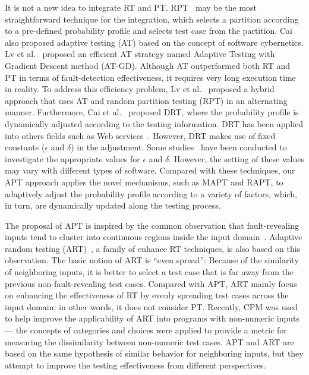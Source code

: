 \documentclass[10pt,journal,compsoc]{IEEEtran}
\begin{document}
It is not a new idea to integrate RT and PT. RPT~\cite{Cai05, Cai07} may be the most straightforward technique for the integration, which selects a partition according to a pre-defined probability profile and selects test case from the partition. Cai~\cite{Cai02} also proposed adaptive testing (AT) based on the concept of software cybernetics. Lv et al.~\cite{LvTSE14} proposed an efficient AT strategy named Adaptive Testing with Gradient Descent method (AT-GD). Although AT outperformed both RT and PT in terms of fault-detection effectiveness, it requires very long execution time in reality. To address this efficiency problem, Lv et al.~\cite{Lv14} proposed a hybrid approach that uses AT and random partition testing (RPT) in an alternating manner. Furthermore, Cai et al.~\cite{Cai09} proposed DRT, where the probability profile is dynamically adjusted according to the testing information. DRT has been applied into others fields such as Web services~\cite{Sun12}. However, DRT makes use of fixed constants ($\epsilon$ and $\delta$) in the adjustment. Some studies~\cite{Lv11, Yang14, Li15} have been conducted to investigate the appropriate values for $\epsilon$ and $\delta$. However, the setting of these values may vary with different types of software. Compared with these techniques, our APT approach applies the novel mechanisms, such as MAPT and RAPT, to adaptively adjust the probability profile according to a variety of factors, which, in turn, are dynamically updated along the testing process.

The proposal of APT is inspired by the common observation that fault-revealing inputs tend to cluster into continuous regions inside the input domain~\cite{White80, Ammann88, Finelli91, Bishop93, Koru08}. Adaptive random testing (ART)~\cite{Chen10}, a family of enhance RT techniques, is also based on this observation. The basic notion of ART is ``even spread'': Because of the similarity of neighboring inputs, it is better to select a test case that is far away from the previous non-fault-revealing test cases. Compared with APT, ART mainly focus on enhancing the effectiveness of RT by evenly spreading test cases across the input domain; in other words, it does not consider PT. Recently, CPM was used to help improve the applicability of ART into programs with non-numeric inputs~\cite{Barus16} --- the concepts of categories and choices were applied to provide a metric for measuring the dissimilarity between non-numeric test cases.
APT and ART are based on the same hypothesis of similar behavior for neighboring inputs, but they attempt to improve the testing effectiveness from different perspectives.
\end{document}
